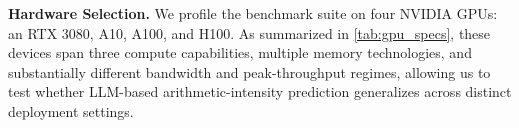 \textbf{Hardware Selection.}
We profile the benchmark suite on four NVIDIA GPUs: an RTX 3080, A10, A100, and H100.
As summarized in \autoref{tab:gpu_specs}, these devices span three compute capabilities, multiple memory technologies, and substantially different bandwidth and peak-throughput regimes, allowing us to test whether LLM-based arithmetic-intensity prediction generalizes across distinct deployment settings.




